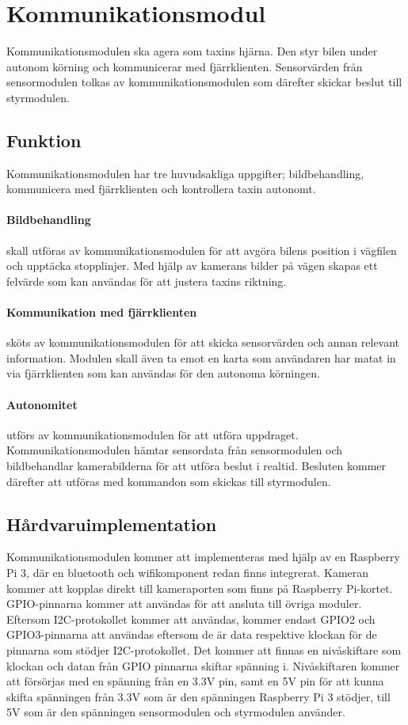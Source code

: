 \documentclass[designspec/spec.tex]{subfiles}
\begin{document}
\section{Kommunikationsmodul}
Kommunikationsmodulen ska agera som taxins hjärna. Den styr bilen under autonom
körning och kommunicerar med fjärrklienten. Sensorvärden från sensormodulen
tolkas av kommunikationsmodulen som därefter skickar beslut till styrmodulen.

\subsection{Funktion}
Kommunikationsmodulen har tre huvudsakliga uppgifter; bildbehandling,
kommunicera med fjärrklienten och kontrollera taxin autonomt.

\paragraph{Bildbehandling} skall utföras av kommunikationsmodulen för att
avgöra bilens position i vägfilen och upptäcka stopplinjer. Med hjälp av
kamerans bilder på vägen skapas ett felvärde som kan användas för att justera
taxins riktning.

\paragraph{Kommunikation med fjärrklienten} sköts av kommunikationsmodulen för
att skicka sensorvärden och annan relevant information. Modulen skall även ta
emot en karta som användaren har matat in via fjärrklienten som kan användas 
för den autonoma körningen.

\paragraph{Autonomitet} utförs av kommunikationsmodulen för att utföra
uppdraget. Kommunikationsmodulen hämtar sensordata från sensormodulen och
bildbehandlar kamerabilderna för att utföra beslut i realtid. Besluten kommer
därefter att utföras med kommandon som skickas till styrmodulen.

\subsection{Hårdvaruimplementation} 
Kommunikationsmodulen kommer att implementeras med hjälp av en Raspberry Pi 3,
där en bluetooth och wifikomponent redan finns integrerat. Kameran kommer att
kopplas direkt till kameraporten som finns på Raspberry Pi-kortet.
GPIO-pinnarna  kommer att användas för att ansluta till övriga moduler.
Eftersom I2C-protokollet kommer att användas, kommer endast GPIO2 och GPIO3-pinnarna att användas eftersom de är data respektive klockan för de pinnarna
som stödjer I2C-protokollet. Det kommer att finnas en nivåskiftare som klockan
och datan från GPIO pinnarna skiftar spänning i. Nivåskiftaren kommer att
försörjas med en spänning från en 3.3V pin, samt en 5V pin
för att kunna skifta spänningen från 3.3V som är den spänningen Raspberry Pi 3
stödjer, till 5V som är den spänningen sensormodulen och styrmodulen använder. 
\end{document}
